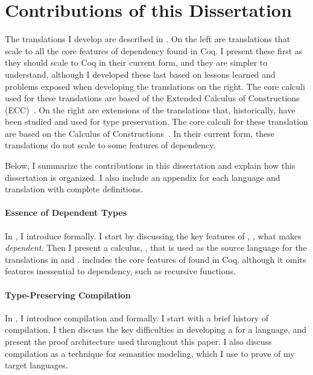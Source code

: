 \section{Contributions of this Dissertation}
\FigThisCompiler
The  translations I develop are described in
.
On the left are translations that scale to all the core features of dependency
found in Coq.
I present these first as they should scale to Coq in their current form, and
they are simpler to understand, although I developed these last based on lessons
learned and problems exposed when developing the translations on the right.
The core calculi used for these translations are based of the Extended Calculus
of Constructions (ECC)~\cite{luo1989}.
On the right are extensions of the translations that, historically, have been
studied and used for type preservation.
The core calculi for these translation are based on the Calculus of
Constructions~\cite{coquand1988}.
In their current form, these translations do not scale to some features of
dependency.

Below, I summarize the contributions in this dissertation and explain how this
dissertation is organized.
I also include an appendix for each language and translation with complete
definitions.

\paragraph{Essence of Dependent Types}
In , I introduce  formally.
I start by discussing the key features of , \ie, what makes
 \emph{dependent}.
Then I present a calculus, \slang, that is used as the source language for
the translations in  and .
\slang includes the core features of  found in Coq, although
it omits features inessential to dependency, such as recursive functions.

\paragraph{Type-Preserving Compilation}
In , I introduce  compilation and
 formally.
I start with a brief history of  compilation.
I then discuss the key difficulties in developing a 
 for a  language, and present the proof
architecture used throughout this paper.
I also discuss  compilation as a technique for semantics
modeling, which I use to prove  of my
 target languages.

